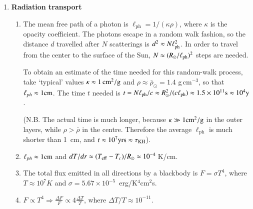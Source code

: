 \documentclass[11pt,a4paper]{report}
\begin{document}

\begin{enumerate}

\item {\bf Radiation transport} 
  \begin{enumerate}


  \item 

    The mean free path of a photon is $\ell_\mathrm{ph} = 1/(\kappa \rho)$,
    where $\kappa$ is the opacity coefficient. The photons escape in a random
    walk fashion, so the distance $d$ travelled after $N$ scatterings is $d^2
    \approx N \ell_{\rm ph}^2$. In order to travel from the center to the
    surface of the Sun, $N \approx (R_{\odot}/\ell_{\rm ph})^2$ steps are
    needed. 

    To obtain an estimate of the time needed for this random-walk
    process, take `typical' values $\kappa \approx
    1\,\rm{cm}^{2}/\rm{g}$ and $\rho \approx \bar{\rho}_\odot = 1.4$
    g\,cm$^{-3}$, so that $\ell_{ph} \approx 1 \rm{cm}$. The time $t$
    needed is $t = N \ell_{\rm ph}/c \approx R_{\odot}^2/(c \ell_{\rm
      ph}) \approx 1.5\times 10^{11} \rm{s} \approx 10^4 \rm{y}$.

    (N.B. The actual time is much longer, because $\kappa \gg 1
    \rm{cm}^2/\rm{g}$ in the outer layers, while $\rho > \bar{\rho}$
    in the centre. Therefore the average $\ell_\mathrm{ph}$ is much
    shorter than 1~cm, and $t \approx 10^7 \rm{yrs} \approx \tau_{\rm
      KH}$).
 
  \item $\ell_{ph} \approx 1 \rm{cm}$ and $dT/dr \approx
    (T_{\rm eff} - T_c)/R_{\odot} \approx 10^{-4}$\,K/cm.
    
    
  \item The total flux emitted in all directions by a blackbody is $F
    = \sigma T^4$, where $T \approx 10^7 K$ and $\sigma = 5.67\times
    10^{-5}$~erg/K$^4$cm$^2$s.

  \item $F \propto T^4 \Rightarrow \displaystyle \frac{\Delta F}{F}
    \propto 4\frac{\Delta T}{T}$, where $\Delta T/T \approx 10^{-11}$.
  

\end{enumerate}
\end{enumerate}
\end{document}
